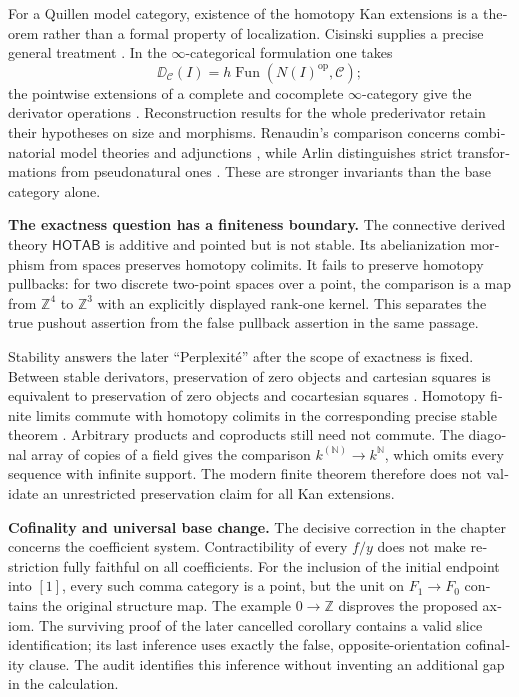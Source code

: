 \begin{otherlanguage}{english}
For a Quillen model category, existence of the homotopy Kan extensions is a theorem rather than a formal property of localization. Cisinski supplies a precise general treatment \citep[Theorem~6.11]{Cisinski2003}. In the $\infty$-categorical formulation one takes
\[
 \DD_{\mathcal C}(I)=h\operatorname{Fun}(N(I)^{\mathrm{op}},\mathcal C);
\]
the pointwise extensions of a complete and cocomplete $\infty$-category give the derivator operations \citep[\S5.3]{RiehlVerity2017}. Reconstruction results for the whole prederivator retain their hypotheses on size and morphisms. Renaudin's comparison concerns combinatorial model theories and adjunctions \citep[Theorems~3.3.2 and~3.4.4]{Renaudin2009}, while Arlin distinguishes strict transformations from pseudonatural ones \citep[Theorems~19 and~29]{Arlin2020}. These are stronger invariants than the base category alone.

\medskip\noindent\textbf{The exactness question has a finiteness boundary.}
The connective derived theory $\mathsf{HOTAB}$ is additive and pointed but is not stable. Its abelianization morphism from spaces preserves homotopy colimits. It fails to preserve homotopy pullbacks: for two discrete two-point spaces over a point, the comparison is a map from $\mathbb Z^4$ to $\mathbb Z^3$ with an explicitly displayed rank-one kernel. This separates the true pushout assertion from the false pullback assertion in the same passage.

Stability answers the later ``Perplexit\'e'' after the scope of exactness is fixed. Between stable derivators, preservation of zero objects and cartesian squares is equivalent to preservation of zero objects and cocartesian squares \citep[Corollary~4.17]{Groth2013}. Homotopy finite limits commute with homotopy colimits in the corresponding precise stable theorem \citep[Theorem~2.14]{GrothShulman2017}. Arbitrary products and coproducts still need not commute. The diagonal array of copies of a field gives the comparison $k^{(\mathbb N)}\to k^{\mathbb N}$, which omits every sequence with infinite support. The modern finite theorem therefore does not validate an unrestricted preservation claim for all Kan extensions.

\medskip\noindent\textbf{Cofinality and universal base change.}
The decisive correction in the chapter concerns the coefficient system. Contractibility of every $f/y$ does not make restriction fully faithful on all coefficients. For the inclusion of the initial endpoint into $[1]$, every such comma category is a point, but the unit on $F_1\to F_0$ contains the original structure map. The example $0\to\mathbb Z$ disproves the proposed axiom. The surviving proof of the later cancelled corollary contains a valid slice identification; its last inference uses exactly the false, opposite-orientation cofinality clause. The audit identifies this inference without inventing an additional gap in the calculation.


\end{otherlanguage}
